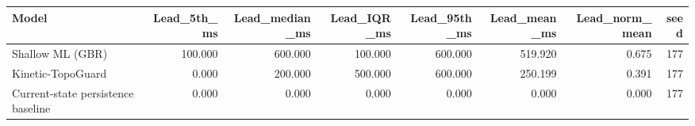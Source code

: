 \begin{tabular}{lrrrrrrr}
\toprule
Model & Lead\_5th\_ms & Lead\_median\_ms & Lead\_IQR\_ms & Lead\_95th\_ms & Lead\_mean\_ms & Lead\_norm\_mean & seed \\
\midrule
Shallow ML (GBR) & 100.000 & 600.000 & 100.000 & 600.000 & 519.920 & 0.675 & 177 \\
Kinetic-TopoGuard & 0.000 & 200.000 & 500.000 & 600.000 & 250.199 & 0.391 & 177 \\
Current-state persistence baseline & 0.000 & 0.000 & 0.000 & 0.000 & 0.000 & 0.000 & 177 \\
\bottomrule
\end{tabular}